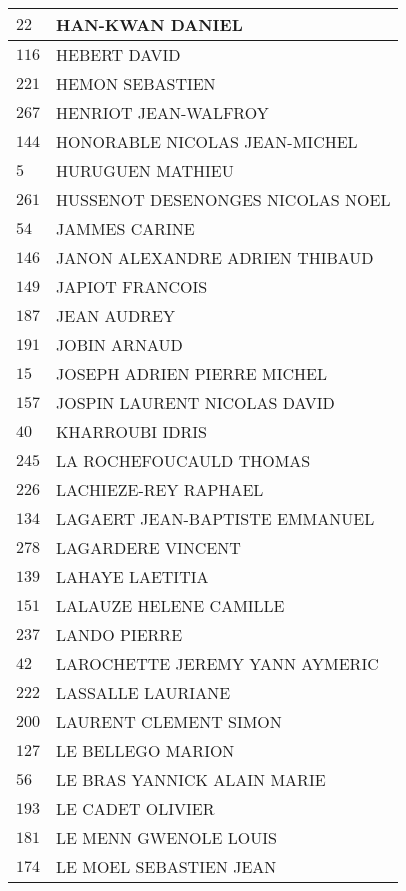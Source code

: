 \begin{xltabular}{\linewidth}{|l|X|}
    \hline
    $22$ & HAN-KWAN DANIEL \\
    \hline
    $116$ & HEBERT DAVID \\
    \hline
    $221$ & HEMON SEBASTIEN \\
    \hline
    $267$ & HENRIOT JEAN-WALFROY \\
    \hline
    $144$ & HONORABLE NICOLAS JEAN-MICHEL \\
    \hline
    $5$ & HURUGUEN MATHIEU \\
    \hline
    $261$ & HUSSENOT DESENONGES NICOLAS NOEL \\
    \hline
    $54$ & JAMMES CARINE \\
    \hline
    $146$ & JANON ALEXANDRE ADRIEN THIBAUD \\
    \hline
    $149$ & JAPIOT FRANCOIS \\
    \hline
    $187$ & JEAN AUDREY \\
    \hline
    $191$ & JOBIN ARNAUD \\
    \hline
    $15$ & JOSEPH ADRIEN PIERRE MICHEL \\
    \hline
    $157$ & JOSPIN LAURENT NICOLAS DAVID \\
    \hline
    $40$ & KHARROUBI IDRIS \\
    \hline
    $245$ & LA ROCHEFOUCAULD THOMAS \\
    \hline
    $226$ & LACHIEZE-REY RAPHAEL \\
    \hline
    $134$ & LAGAERT JEAN-BAPTISTE EMMANUEL \\
    \hline
    $278$ & LAGARDERE VINCENT \\
    \hline
    $139$ & LAHAYE LAETITIA \\
    \hline
    $151$ & LALAUZE HELENE CAMILLE \\
    \hline
    $237$ & LANDO PIERRE \\
    \hline
    $42$ & LAROCHETTE JEREMY YANN AYMERIC \\
    \hline
    $222$ & LASSALLE LAURIANE \\
    \hline
    $200$ & LAURENT CLEMENT SIMON \\
    \hline
    $127$ & LE BELLEGO MARION \\
    \hline
    $56$ & LE BRAS YANNICK ALAIN MARIE \\
    \hline
    $193$ & LE CADET OLIVIER \\
    \hline
    $181$ & LE MENN GWENOLE LOUIS \\
    \hline
    $174$ & LE MOEL SEBASTIEN JEAN \\

\end{xltabular}

